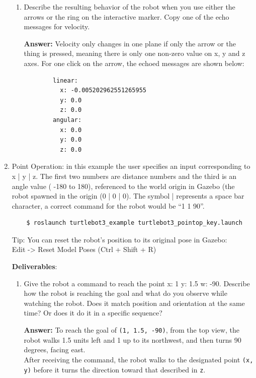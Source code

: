 \documentclass[12pt]{article}
\begin{document}
\begin{enumerate}
\begin{enumerate}
      \item Describe the resulting behavior of the robot when you use either the arrows or the ring on the interactive marker. Copy one of the echo messages for velocity.
    
      \textbf{Answer: }Velocity only changes in one plane if only the arrow or the thing is pressed, meaning there is only one non-zero value on x, y and z axes. For one click on the arrow, the echoed messages are shown below:

      \begin{verbatim}
        linear:
          x: -0.005202962551265955
          y: 0.0
          z: 0.0
        angular:
          x: 0.0
          y: 0.0
          z: 0.0
      \end{verbatim}

    \end{enumerate}

  \item Point Operation: in this example the user specifies an input corresponding to x | y | z. The first two numbers are distance numbers and the third is an angle value ( -180 to 180), referenced to the world origin in Gazebo (the robot spawned in the origin (0 | 0 | 0). The symbol | represents a space bar character, a correct command for the robot would be “1 1 90”.

  \begin{verbatim}
    $ roslaunch turtlebot3_example turtlebot3_pointop_key.launch
  \end{verbatim}

  Tip: You can reset the robot’s position to its original pose in Gazebo:\\
  Edit -> Reset Model Poses (Ctrl + Shift + R)

  \textbf{Deliverables}:

  \begin{enumerate}

      \item Give the robot a command to reach the point x: 1 y: 1.5 w: -90. Describe how the robot is reaching the goal and what do you observe while watching the robot. Does it match position and orientation at the same time? Or does it do it in a specific sequence?
      
      \textbf{Answer: }To reach the goal of \texttt{(1, 1.5, -90)}, from the top view, the robot walks 1.5 units left and 1 up to its northwest, and then turns 90 degrees, facing east.
      \\After receiving the command, the robot walks to the designated point \texttt{(x, y)} before it turns the direction toward that described in \texttt{z}.


\end{enumerate}
\end{enumerate}
\end{document}
